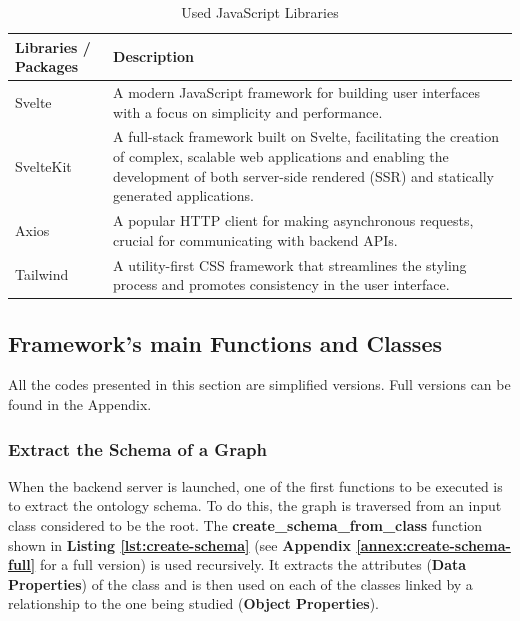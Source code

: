         \begin{table}[h]
            \centering
    	    {
    	    \begin{tabular}{ | m{2.5cm} | m{12cm} | }
                \hline
                \rowcolor{teal!30} Libraries / Packages & Description \\
                
                \hline
                Svelte & A modern JavaScript framework for building user interfaces with a focus on simplicity and performance. \\

                \hline
                SvelteKit & A full-stack framework built on Svelte, facilitating the creation of complex, scalable web applications and enabling the development of both server-side rendered (SSR) and statically generated applications. \\

                \hline
                Axios & A popular HTTP client for making asynchronous requests, crucial for communicating with backend APIs. \\

                \hline
                Tailwind & A utility-first CSS framework that streamlines the styling process and promotes consistency in the user interface.\\

                \hline
            \end{tabular}}
            \caption{\label{tab:js-libs} Used JavaScript Libraries}
        \end{table}
        
\subsection{Framework's main Functions and Classes}
All the codes presented in this section are simplified versions. Full versions can be found in the Appendix.\\

\subsubsection{Extract the Schema of a Graph}
 When the backend server is launched, one of the first functions to be executed is to extract the ontology schema. To do this, the graph is traversed from an input class considered to be the root. The \textbf{create\_schema\_from\_class} function shown in \textbf{Listing \ref{lst:create-schema}} (see \textbf{Appendix \ref{annex:create-schema-full}} for a full version) is used recursively. It extracts the attributes (\textbf{Data Properties}) of the class and is then used on each of the classes linked by a relationship to the one being studied (\textbf{Object Properties}).\\

